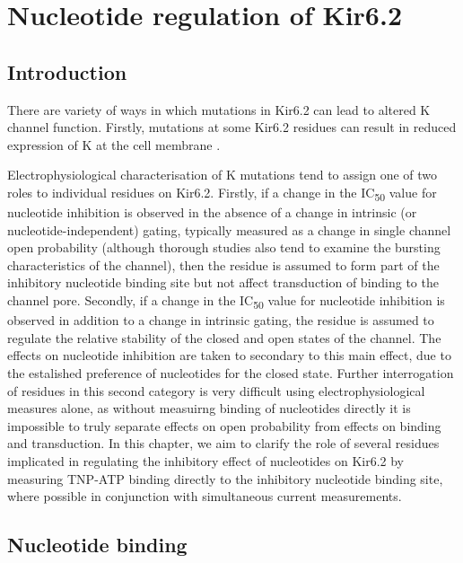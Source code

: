 \chapter{\label{ch:5}Nucleotide regulation of Kir6.2} 

\graphicspath{{figures/ch5/}}

\minitoc

\section{Introduction}

There are variety of ways in which mutations in Kir6.2 can lead to altered K\ATP{} channel function.
Firstly, mutations at some Kir6.2 residues can result in reduced expression of K\ATP{} at the cell membrane \cite{tornovsky_hyperinsulinism_2004, flanagan_update_2009, martin_pharmacological_2013, pipatpolkai_new_2020}.


Electrophysiological characterisation of K\ATP{} mutations tend to assign one of two roles to individual residues on Kir6.2.
Firstly, if a change in the IC\textsubscript{50} value for nucleotide inhibition is observed in the absence of a change in intrinsic (or nucleotide-independent) gating, typically measured as a change in single channel open probability (although thorough studies also tend to examine the bursting characteristics of the channel), then the residue is assumed to form part of the inhibitory nucleotide binding site but not affect transduction of binding to the channel pore.
Secondly, if a change in the IC\textsubscript{50} value for nucleotide inhibition is observed in addition to a change in intrinsic gating, the residue is assumed to regulate the relative stability of the closed and open states of the channel.
The effects on nucleotide inhibition are taken to secondary to this main effect, due to the estalished preference of nucleotides for the closed state.
Further interrogation of residues in this second category is very difficult using electrophysiological measures alone, as without measuirng binding of nucleotides directly it is impossible to truly separate effects on open probability from effects on binding and transduction.
In this chapter, we aim to clarify the role of several residues implicated in regulating the inhibitory effect of nucleotides on Kir6.2 by measuring TNP-ATP
binding directly to the inhibitory nucleotide binding site, where possible in conjunction with simultaneous current measurements.

\section{Nucleotide binding}

